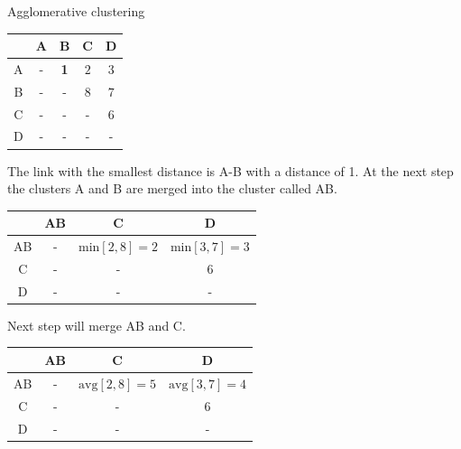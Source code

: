 \begin{example}
  \small
  \centering
  \caption{Agglomerative clustering}
  \label{ex:agglomerative_clustering}

  \begin{subexample}{\linewidth}
    \centering
    \begin{tabular}{c|c c c c}
      \toprule
        & A & B & C & D \\
      \midrule
      A & - & \textbf{1} & $2$ & $3$ \\
      B & - & - & $8$ & $7$\\
      C & - & - & - & $6$ \\
      D & - & - & - & - \\
      \bottomrule
    \end{tabular}
  \end{subexample}

  \vspace{0.2cm}
  The link with the smallest distance is A-B with a distance of 1.
  At the next step the clusters A and B are merged into the cluster called AB.

  \vspace{0.5cm}

  \begin{subexample}{\linewidth}
    \centering
    \begin{tabular}{c|c c c}
      \toprule
        & AB & C & D \\
      \midrule
      AB & - & $\text{min} \left[2, 8 \right] = 2$ & $\text{min} \left[3, 7 \right] = 3$ \\
      C  & - & - & $6$ \\
      D  & - & - & - \\
      \bottomrule
    \end{tabular}
  \end{subexample}

  \vspace{0.2cm}
  Next step will merge AB and C.

  \vspace{0.5cm}

  \begin{subexample}{\linewidth}
    \centering
    \begin{tabular}{c|c c c}
      \toprule
        & AB & C & D \\
      \midrule
      AB & - & $\text{avg} \left[2, 8 \right] = 5$ & $\text{avg} \left[3, 7 \right] = 4$ \\
      C  & - & - & $6$ \\
      D  & - & - & - \\
      \bottomrule
    \end{tabular}
  \end{subexample}


\end{example}
